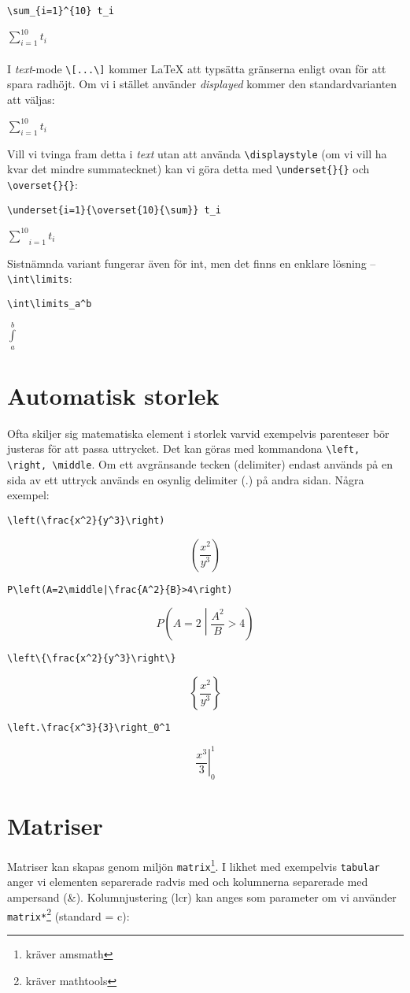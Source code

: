 \verb+\sum_{i=1}^{10} t_i+

$\sum_{i=1}^{10} t_i$
\\\\
I \emph{text}-mode \verb+\[...\]+ kommer \LaTeX{} att typsätta gränserna enligt ovan för att spara radhöjt. Om vi i stället använder \emph{displayed} kommer den standardvarianten att väljas:

$\displaystyle\sum_{i=1}^{10} t_i$

Vill vi tvinga fram detta i \emph{text} utan att använda \verb+\displaystyle+ (om vi vill ha kvar det mindre summatecknet) kan vi göra detta med \verb+\underset{}{}+ och \verb+\overset{}{}+:

\verb+\underset{i=1}{\overset{10}{\sum}} t_i+

$\underset{i=1}{\overset{10}{\sum}} t_i$

Sistnämnda variant fungerar även för \tb int, men det finns en enklare lösning -- \verb+\int\limits+:

\verb+\int\limits_a^b+

$\displaystyle \int\limits_a^b$

\section{Automatisk storlek}\label{sec:lrm}
Ofta skiljer sig matematiska element i storlek varvid exempelvis parenteser bör justeras för att passa uttrycket. Det kan göras med kommandona \verb+\left, \right, \middle+. Om ett avgränsande tecken (delimiter) endast används på en sida av ett uttryck används en osynlig delimiter (.) på andra sidan. Några exempel:

\verb+\left(\frac{x^2}{y^3}\right)+

$$\left(\frac{x^2}{y^3}\right)$$

\verb+P\left(A=2\middle|\frac{A^2}{B}>4\right)+

$$P\left(A=2\middle|\frac{A^2}{B}>4\right)$$

\verb+\left\{\frac{x^2}{y^3}\right\}+

$$\left\{\frac{x^2}{y^3}\right\}$$

\verb+\left.\frac{x^3}{3}\right_0^1+

$$\left.\frac{x^3}{3}\right|_0^1$$

\section{Matriser}
Matriser kan skapas genom miljön \verb+matrix+\footnote{kräver amsmath}. I likhet med exempelvis \verb+tabular+ anger vi elementen separerade radvis med \tb\tb{} och kolumnerna separerade med ampersand (\&). Kolumnjustering (lcr) kan anges som parameter om vi använder \verb+matrix*+\footnote{kräver mathtools} (standard = c):


